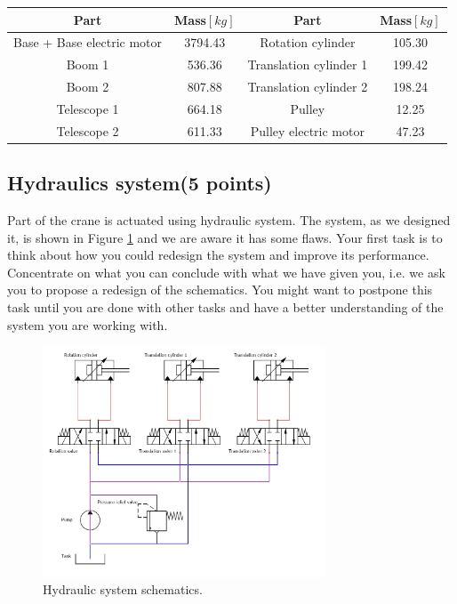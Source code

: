 \documentclass[openany]{book}
\begin{document}
	\begin{center}
		\label{tab:crane_tab}
		\begin{tabular}{||c|| c || c|| c ||}
			\hline
			Part & Mass$[kg]$ & Part & Mass$[kg]$ \\
			\hline\hline
			Base + Base electric motor & 3794.43 & Rotation cylinder & 105.30\\ 
			\hline
			Boom 1 & 536.36 & Translation cylinder 1 & 199.42\\
			\hline
			Boom 2 & 807.88 & Translation cylinder 2 & 198.24\\
			\hline
			Telescope 1 & 664.18 & Pulley & 12.25\\
			\hline
			Telescope 2 & 611.33 & Pulley electric motor & 47.23\\
			\hline
		\end{tabular}
	\end{center}
	
	\subsection{Hydraulics system(5 points)}
	
	Part of the crane is actuated using hydraulic system. The system, as we 
	designed it, is shown in Figure \ref{fig:hydraulic} and we are aware it has 
	some flaws. Your first task is to think about how you could redesign the 
	system and improve its performance. Concentrate on what you can conclude 
	with what we have given you, i.e. we ask you to propose a redesign of the 
	schematics. You might want to postpone this task until you are done with 
	other tasks and have a better understanding of the system you are working 
	with.
	
	\begin{figure}[h!]
		\centering
		\includegraphics[width=0.75\textwidth]{hidraulika_shema.jpg}
		\caption{Hydraulic system schematics.}
		\label{fig:hydraulic}
	\end{figure}
	
\end{document}
